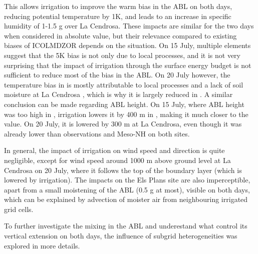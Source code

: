 This allows irrigation to improve the warm bias in the ABL on both days, reducing potential temperature by 1K, and leads to an increase in specific humidity of 1-1.5 g \perkg over La Cendrosa.
These impacts are similar for the two days when considered in absolute value, but their relevance compared to existing biases of ICOLMDZOR depends on the situation.
On 15 July, multiple elements suggest that the 5K bias is not only due to local processes, and it is not very surprising that the impact of irrigation through the surface energy budget is not sufficient to reduce most of the bias in the ABL. On 20 July however, the temperature bias in \noirr is mostly attributable to local processes and a lack of soil moisture at La Cendrosa , which is why it is largely reduced in \irrboost. 
A similar conclusion can be made regarding ABL height. On 15 July, where ABL height was too high in \noirr, irrigation lowers it by 400 m in \irrboost, making it much closer to the \mesomean value. On 20 July, it is lowered by 300 m at La Cendrosa, even though it was already lower than observations and Meso-NH on both sites.

In general, the impact of irrigation on wind speed and direction is quite negligible, except for wind speed around 1000 m above ground level at La Cendrosa on 20 July, where it follows the top of the boundary layer (which is lowered by irrigation).
The impacts on the Els Plans site are also imperceptible, apart from a small moistening of the ABL (0.5 g \perkg at most), visible on both days, which can be explained by advection of moister air from neighbouring irrigated grid cells.

To further investigate the mixing in the ABL and underestand what control its vertical extension on both days, the influence of subgrid heterogeneities was explored in more details.

